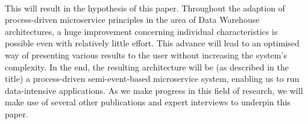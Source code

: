\\
This will result in the hypothesis of this paper. Throughout the adaption of process-driven microservice principles in the area of Data Warehouse architectures, a huge improvement concerning individual characteristics is possible even with relatively little effort. This advance will lead to an optimised way of presenting various results to the user without increasing the system's complexity.\newline 
In the end, the resulting architecture will be (as described in the title) a process-driven semi-event-based microservice system, enabling us to run data-intensive applications. \newline
As we make progress in this field of research, we will make use of several other publications and expert interviews to underpin this paper. 